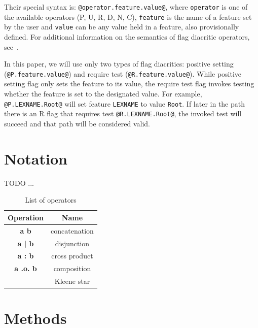 \documentclass[11pt]{article}
\begin{document}
Their special syntax is: \verb+@operator.feature.value@+, where
\texttt{operator} is one of the available operators (P, U, R, D, N, C), \texttt{feature} is the name of a feature set by the user and \texttt{value} can be any value held in a feature, also provisionally defined. For additional information on the semantics of flag diacritic operators, see~.


In this paper, we will use only two types of flag diacritics: positive
setting (\verb+@P.feature.value@+) and require test
(\verb+@R.feature.value@+). While positive setting flag only sets the
feature to its value, the require test flag invokes testing whether the
feature is set to the designated value. For example,
\verb+@P.LEXNAME.Root@+ will set feature \texttt{LEXNAME} to value
\texttt{Root}. If later in the path there is an R flag that requires test
\verb+@R.LEXNAME.Root@+, the invoked test will succeed and that path
will be considered valid.


\section{Notation}
\label{sec:notation}
TODO ...


\begin{table}[h]
    \centering
    \begin{tabular}{|c|c|}
        \hline
        \bf Operation & \bf Name \\
        \hline\hline
        \bf a b & concatenation  \\
        \bf a | b & disjunction  \\
        \bf a : b & cross product  \\
        \bf a .o. b & composition  \\
        \bf * & Kleene star  \\
        

        \hline
    \end{tabular}
    \caption{List of operators
    \label{table:operators}}
\end{table}




\section{Methods}
\label{sec:methods}
\end{document}

